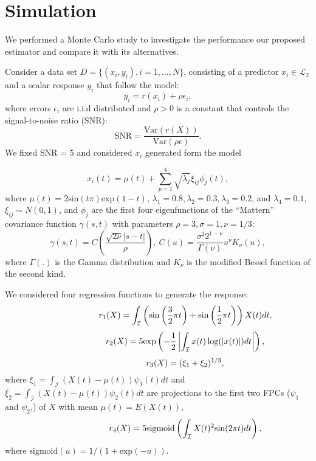    \section{Simulation} 
We performed a Monte Carlo study to investigate the performance our proposed estimator and compare it with its alternatives. 

Consider a data set $D = \{(x_i, y_i), i = 1,..., N\}$, consisting of a predictor $x_i\in\mathcal{L}_2$ and a scalar response $y_i$ that follow the model: 
 \begin{equation} \label{eq:gen}
y_i = r(x_i) + \rho \epsilon_i,
\end{equation}
where errors $\epsilon_i$ are i.i.d distributed and  $\rho > 0$ is a constant that controls the signal-to-noise ratio (SNR): 
$$\text{SNR} = \frac{\text{Var}(r(X))}{\text{Var}(\rho\epsilon)}.$$
We fixed SNR = 5 and considered $x_i$ generated form the model 

 $$x_i(t) = \mu(t) + \sum_{p=1}^4 \sqrt{\lambda_j}\xi_{ij}\phi_j(t),$$
where $\mu(t) = 2\text{sin}(t\pi) \text{exp}(1-t)$, $\lambda_1 = 0.8, \lambda_2 = 0.3, \lambda_3 = 0.2$, and $\lambda_4 = 0.1$,  $\xi_{ij}\sim N(0,1) $,  and $\phi_j$ are the first four eigenfunctions of the ``Mattern'' covariance function $\gamma(s,t)$ with parameters $\rho = 3, \sigma = 1, \nu = 1/3$: 
 $$\gamma(s,t) = C\left(\frac{\sqrt{2\nu}|s-t|}{\rho}\right), \ C(u) = \frac{\sigma^2 2^{1-\nu}}{\Gamma(\nu)} u^{\nu} K_{\nu}(u),$$
  where $\Gamma(.)$ is the Gamma distribution and $K_{\nu}$ is the modified Bessel function of the second kind.
  
 We considered four regression functions to generate the response: 
\mathleft
\begin{equation*}
\hspace{15ex}
	r_1(X) =  \int_{\mathcal{I}} \left (\text{sin} \left(\frac{3}{2} \pi t \right) +  \text{sin} \left(\frac{1}{2} \pi t \right)\right)X(t)dt,
\end{equation*}
\mathleft
\begin{equation*}
\hspace{15ex}
	r_2(X) = 5\text{exp}\left (- \frac{1}{2}\left| \int_{\mathcal{I}} x(t)\log(|x(t)|)dt \right| \right),
\end{equation*}
\mathleft
\begin{equation*}
\hspace{15ex}
r_3(X) = (\xi_1 + \xi_2)^{1/3},
\end{equation*}
where  $\xi_1 = \int_{\mathcal{I}} (X(t) - \mu(t))\psi_1(t) dt$ and $\xi_2 = \int_{\mathcal{I}} (X(t) - \mu(t))\psi_2(t) dt$ are projections to the first two FPCs ($\psi_1$ and $\psi_2$,) of $X$ with mean  $\mu(t) = E(X(t))$, 
\begin{equation*}
\hspace{15ex}
r_4(X) = 5\text{sigmoid}\left(\int_{\mathcal{I}}X(t)^2 \text{sin}(2\pi t) dt \right),
\end{equation*}
where  $\text{sigmoid}(u) = 1/(1+ \text{exp}(-u))$. 
 
